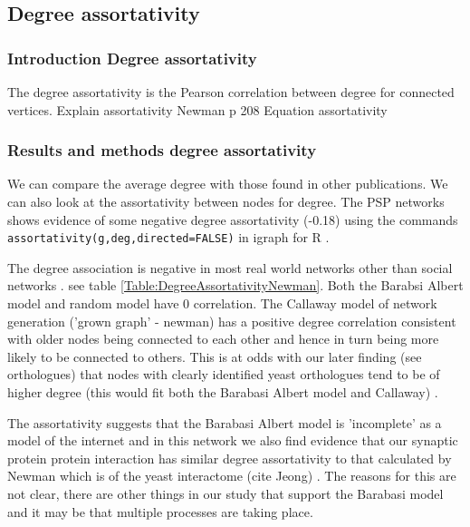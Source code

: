 \subsection{Degree assortativity}
\label{sec:degree assortativity extra}
\subsubsection{Introduction Degree assortativity}
The degree assortativity is the Pearson correlation between degree for connected vertices.\cite{noldus2015assortativity} Explain assortativity
Newman p 208
Equation assortativity


\subsubsection{Results and methods degree assortativity}
We can compare the average degree with those found in other publications. We can also look at the assortativity between nodes for degree. The PSP networks shows evidence of some negative degree assortativity (-0.18) using the commands \texttt{assortativity(g,deg,directed=FALSE)} in igraph for R .

The degree association is negative in most real world networks other than social networks \cite{newman2002assortative}.  see table \ref{Table:DegreeAssortativityNewman}. Both the Barabsi Albert model and random model have 0 correlation. The Callaway model of network generation ('grown graph' - newman) has a positive degree correlation consistent with older nodes being connected to each other and hence in turn being more likely to be connected to others. This is at odds with our later finding (see orthologues) that nodes with clearly identified yeast orthologues tend to be of higher degree (this would fit both the Barabasi Albert model and Callaway) . 

The assortativity suggests that the Barabasi Albert model is 'incomplete' as a model of the internet \cite{newman2002assortative} and in this network we also find evidence that our synaptic protein protein interaction has similar degree assortativity to that calculated by Newman which is of the yeast interactome (cite Jeong) . The reasons for this are not clear, there are other things in our study that support the Barabasi model and it may be that multiple processes are taking place. 

